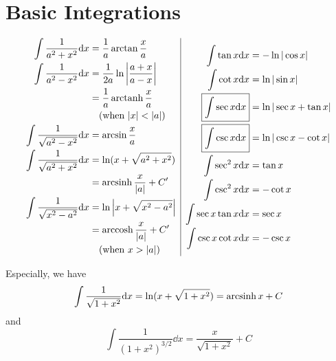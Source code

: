 \documentclass{overview}
\begin{document}
\section{Basic Integrations}
\[
	\begin{array}{c|c}
		\begin{aligned}
			\int \frac{1}{a^2 + x^2} \mathrm{d} x &= \frac{1}{a} \arctan \frac{x}{a} \\
			\int \frac{1}{a^2 - x^2} \mathrm{d} x &= \frac{1}{2a} \ln \left| \frac{a+x}{a-x} \right| \\
																		 &= \frac{1}{a} \operatorname{arctanh} \frac{x}{a} \\
																		 &\quad\text{(when } |x| < |a| \text{)} \\
			\int \frac{1}{\sqrt{a^2 - x^2}} \mathrm{d} x &= \arcsin \frac{x}{a} \\
			\int \frac{1}{\sqrt{a^2 + x^2}} \mathrm{d} x &= \ln( x + \sqrt{a^2 + x^2}) \\
																		 &= \operatorname{arcsinh} \frac{x}{|a|} +C'\\
			\int \frac{1}{\sqrt{x^2 - a^2}} \mathrm{d} x &= \ln \left| x + \sqrt{x^2 - a^2} \right| \\
																		 &= \operatorname{arccosh} \frac{x}{|a|} +C' \\
																		 &\quad\text{(when } x > |a| \text{)} \\
		\end{aligned} &
		\begin{aligned}
			\int \tan x \mathrm{d} x &= -\ln|\cos x| \\
			\int \cot x \mathrm{d} x &= \ln|\sin x| \\
			\boxed{ \int \sec x \mathrm{d} x} &= \ln|\sec x + \tan x| \\
			\boxed{\int \csc x \mathrm{d} x} &= \ln|\csc x - \cot x| \\
			\int \sec^2 x \mathrm{d} x &= \tan x \\
			\int \csc^2 x \mathrm{d} x &= -\cot x \\
			\int \sec x \tan x \mathrm{d} x &= \sec x \\
			\int \csc x \cot x \mathrm{d} x &= -\csc x \\
		\end{aligned}
	\end{array}
\] 

Especially, we have
\[
	\int \frac{1}{\sqrt{1+x^2}} \mathrm{d} x = \ln(x + \sqrt{1+x^2}) = \operatorname{arcsinh} x + C
\] 
and
\[
	\int \frac{1}{(1+x^2)^{3/2}} \dd x = \frac{x}{\sqrt{1+x^2}} + C
\] 
\end{document}
